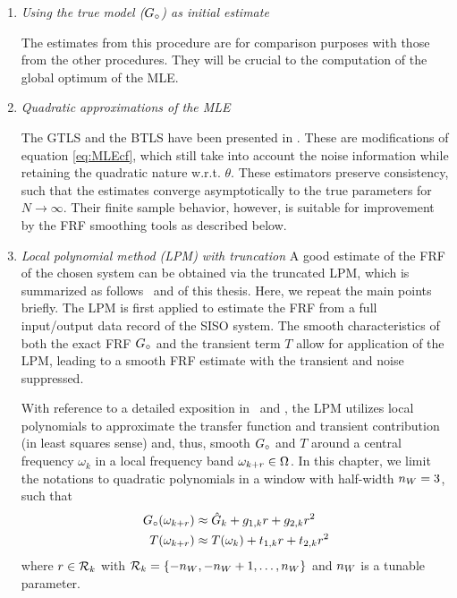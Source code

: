 \begin{enumerate}
\item \emph{Using the true model (${G}_{\circ}$) as initial estimate}

The estimates from this procedure are for comparison purposes with those from the other procedures. They will be crucial to the computation of the global optimum of the \gls{MLE}.

\item \emph{Quadratic approximations of the \gls{MLE}}

The \gls{GTLS} and the \gls{BTLS} have been presented in \citep{Pintelon1998}. 
These are modifications of equation \eqref{eq:MLEcf}, which still take into account the noise information while retaining the quadratic nature w.r.t. $\theta$. 
These estimators preserve consistency, such that the estimates converge asymptotically to the true parameters for $N\to\infty$. 
Their finite sample behavior, however, is suitable for improvement by the \gls{FRF} smoothing tools as described below.

\item \emph{Local polynomial method (LPM) with truncation}
A good estimate of the \gls{FRF} of the chosen system can be obtained via the truncated \gls{LPM}, which is summarized as follows~\citep{Lumori2014TIM} and  of this thesis.
Here, we repeat the main points briefly.
The \gls{LPM} is first applied to estimate the \gls{FRF} from a full input/output data record of the \gls{SISO} system.
The smooth characteristics of both the exact \gls{FRF} ${G}_{\circ}$ and the transient term $T$ allow for application of the \gls{LPM}, leading to a smooth \gls{FRF} estimate with the transient and noise suppressed.

  With reference to a detailed exposition in~\citep{Lumori2014TIM} and , the \gls{LPM} utilizes local polynomials to approximate the transfer function and transient contribution (in least squares sense) and, thus, smooth ${G}_{\circ}$ and $T$ around a central frequency $\omega_{k}$ in a local frequency band $\omega_{k+r}\in\Omega_{}$.
  In this chapter, we limit the notations to quadratic polynomials in a window with half-width $n_{W}=3$, such that
\begin{subequations}\label{lpmImplQuadG}
\begin{align}
{G}_{\circ}(\omega_{k+r})&\approx \hat G_k + g_{1,k} r + g_{2,k}r^2
\\
T(\omega_{k+r})&\approx T(\omega_k)+t_{1,k}r + t_{2,k}r^2
\label{lpmImplQuadT}
\end{align}
\end{subequations}
where $r \in \mathcal{R}_{k}$ with $\mathcal{R}_{k} = \{-n_{W},-n_{W}+1,\dots,n_{W}\}$ and $n_{W}$ is a tunable parameter. 


\end{enumerate}
